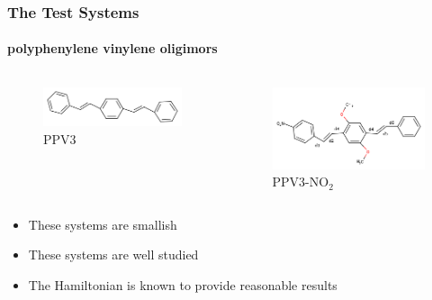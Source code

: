 \documentclass{beamer}
\begin{document}
\begin{frame}
  \frametitle{The Test Systems}
  \framesubtitle{polyphenylene vinylene oligimors}
\begin{columns}[b]
 \begin{figure}
  \includegraphics[width=\textwidth]{Images/ppv3.png}
  \caption{PPV3}
 \end{figure}
 
 \begin{figure}
  \includegraphics[width=\textwidth]{Images/ppvno2.png}
  \caption{PPV3-NO$_2$}
 \end{figure}
\end{columns}
\begin{block}{}
  \begin{itemize}
    \item These systems are smallish
    \item These systems are well studied
    \item The Hamiltonian is known to provide reasonable results
  \end{itemize}
\end{block}

\end{frame}
\end{document}
